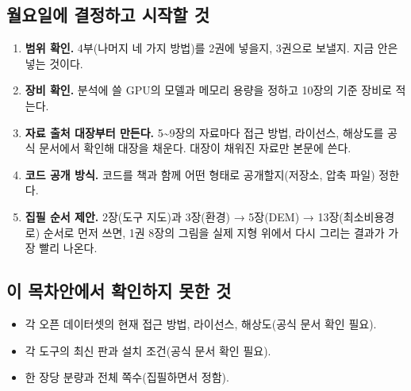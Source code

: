 \documentclass[10pt,a4paper]{article}
\providecommand{\tightlist}{\setlength{\itemsep}{0pt}\setlength{\parskip}{0pt}}
\begin{document}
\hypertarget{uxc6d4uxc694uxc77cuxc5d0-uxacb0uxc815uxd558uxace0-uxc2dcuxc791uxd560-uxac83}{%
\subsection{월요일에 결정하고 시작할 것}\label{uxc6d4uxc694uxc77cuxc5d0-uxacb0uxc815uxd558uxace0-uxc2dcuxc791uxd560-uxac83}}

\begin{enumerate}
\def\labelenumi{\arabic{enumi}.}
\tightlist
\item
  \textbf{범위 확인.} 4부(나머지 네 가지 방법)를 2권에 넣을지, 3권으로 보낼지. 지금 안은 넣는 것이다.
\item
  \textbf{장비 확인.} 분석에 쓸 GPU의 모델과 메모리 용량을 정하고 10장의 기준 장비로 적는다.
\item
  \textbf{자료 출처 대장부터 만든다.} 5\textasciitilde9장의 자료마다 접근 방법, 라이선스, 해상도를 공식 문서에서 확인해 대장을 채운다. 대장이 채워진 자료만 본문에 쓴다.
\item
  \textbf{코드 공개 방식.} 코드를 책과 함께 어떤 형태로 공개할지(저장소, 압축 파일) 정한다.
\item
  \textbf{집필 순서 제안.} 2장(도구 지도)과 3장(환경) → 5장(DEM) → 13장(최소비용경로) 순서로 먼저 쓰면, 1권 8장의 그림을 실제 지형 위에서 다시 그리는 결과가 가장 빨리 나온다.
\end{enumerate}

\hypertarget{uxc774-uxbaa9uxcc28uxc548uxc5d0uxc11c-uxd655uxc778uxd558uxc9c0-uxbabbuxd55c-uxac83}{%
\subsection{이 목차안에서 확인하지 못한 것}\label{uxc774-uxbaa9uxcc28uxc548uxc5d0uxc11c-uxd655uxc778uxd558uxc9c0-uxbabbuxd55c-uxac83}}

\begin{itemize}
\tightlist
\item
  각 오픈 데이터셋의 현재 접근 방법, 라이선스, 해상도(공식 문서 확인 필요).
\item
  각 도구의 최신 판과 설치 조건(공식 문서 확인 필요).
\item
  한 장당 분량과 전체 쪽수(집필하면서 정함).
\end{itemize}
\end{document}
